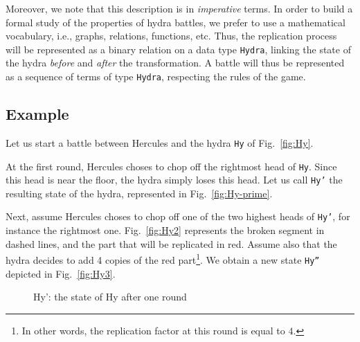 Moreover, we note that this description is in \emph{imperative} terms. In order to build a formal  study of the properties of hydra battles, we prefer to use a mathematical vocabulary, i.e., graphs, relations, functions, etc.
Thus, the replication process will be represented as a binary relation on a data type \texttt{Hydra},
linking the state of the hydra \emph{before} and \emph{after} the transformation.
A battle will thus be represented as a sequence of terms of type \texttt{Hydra}, respecting the rules of the game.





\subsection{Example}
Let us start a battle between Hercules and the hydra \texttt{Hy} of Fig.~\ref{fig:Hy}.

At the first round, Hercules choses to chop off the rightmost head of \texttt{Hy}.
Since this head is near the floor, the hydra simply loses this head. Let us call 
 \texttt{Hy'} the resulting state of the hydra, represented in Fig.~\vref{fig:Hy-prime}.

Next, assume Hercules choses to chop off one of the two highest heads of \texttt{Hy'}, for instance the rightmost one. Fig.~\vref{fig:Hy2} represents the broken segment in dashed lines, and the part that will be replicated in red. Assume also that the hydra decides to add 4 copies of the red part\footnote{In other words, the replication factor at this round is equal to $4$.}. We obtain a new state \texttt{Hy''} depicted in Fig.~\ref{fig:Hy3}.



\begin{figure}[h]
\centering
{}

\caption{Hy': the state  of Hy after one round \label{fig:Hy-prime}}
\end{figure}


